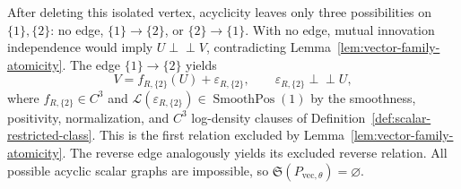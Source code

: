After deleting this isolated vertex, acyclicity leaves only three possibilities on \(\{1\},\{2\}\): no edge, \(\{1\}\to\{2\}\), or \(\{2\}\to\{1\}\).  With no edge, mutual innovation independence would imply \(U\perp\!\!\!\perp V\), contradicting Lemma~\ref{lem:vector-family-atomicity}.  The edge \(\{1\}\to\{2\}\) yields
\[
 V=f_{R,\{2\}}(U)+\varepsilon_{R,\{2\}},
 \qquad \varepsilon_{R,\{2\}}\perp\!\!\!\perp U,
\]
where \(f_{R,\{2\}}\in C^3\) and \(\mathcal L(\varepsilon_{R,\{2\}})\in\operatorname{SmoothPos}(1)\) by the smoothness, positivity, normalization, and \(C^3\) log-density clauses of Definition~\ref{def:scalar-restricted-class}.  This is the first relation excluded by Lemma~\ref{lem:vector-family-atomicity}.  The reverse edge analogously yields its excluded reverse relation.  All possible acyclic scalar graphs are impossible, so \(\mathfrak S(P_{\mathrm{vec},\theta})=\varnothing\).